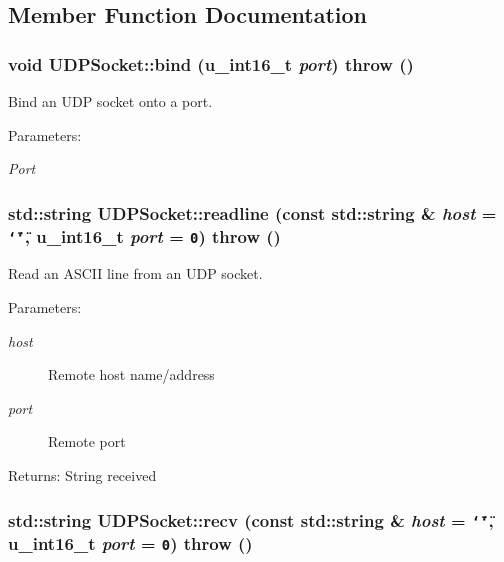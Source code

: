 \subsection{Member Function Documentation}
\hypertarget{classUDPSocket_93ca497a5e6539eab464c4bd59a85de2}{
\subsubsection[{bind}]{\setlength{\rightskip}{0pt plus 5cm}void UDPSocket::bind (u\_\-int16\_\-t {\em port})  throw ()}}
\label{classUDPSocket_93ca497a5e6539eab464c4bd59a85de2}


Bind an UDP socket onto a port. 

\begin{Desc}
\item[Parameters:]
\begin{description}
\item[{\em Port}]\end{description}
\end{Desc}
\hypertarget{classUDPSocket_212e096b3245ea32b66f43c592903838}{
\subsubsection[{readline}]{\setlength{\rightskip}{0pt plus 5cm}std::string UDPSocket::readline (const std::string \& {\em host} = {\tt \char`\"{}\char`\"{}}, \/  u\_\-int16\_\-t {\em port} = {\tt 0})  throw ()}}
\label{classUDPSocket_212e096b3245ea32b66f43c592903838}


Read an ASCII line from an UDP socket. 

\begin{Desc}
\item[Parameters:]
\begin{description}
\item[{\em host}]Remote host name/address \item[{\em port}]Remote port \end{description}
\end{Desc}
\begin{Desc}
\item[Returns:]String received \end{Desc}
\hypertarget{classUDPSocket_688933363fb0b6b9819234dcfe13931b}{
\subsubsection[{recv}]{\setlength{\rightskip}{0pt plus 5cm}std::string UDPSocket::recv (const std::string \& {\em host} = {\tt \char`\"{}\char`\"{}}, \/  u\_\-int16\_\-t {\em port} = {\tt 0})  throw ()}}
\label{classUDPSocket_688933363fb0b6b9819234dcfe13931b}


